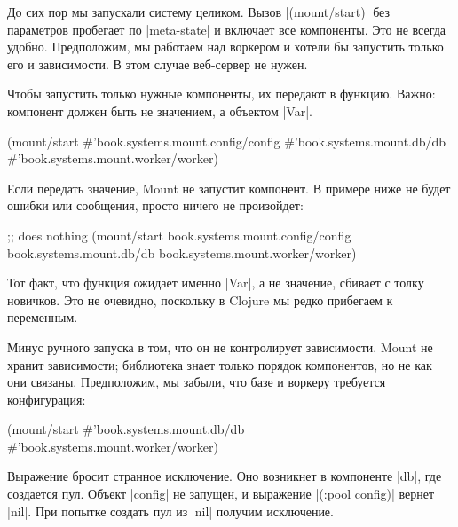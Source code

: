 До сих пор мы запускали систему целиком. Вызов \spverb|(mount/start)| без
параметров пробегает по \spverb|meta-state| и включает все компоненты. Это не
всегда удобно. Предположим, мы работаем над воркером и хотели бы запустить
только его и зависимости. В этом случае веб-сервер не нужен.

Чтобы запустить только нужные компоненты, их передают в функцию. Важно:
компонент должен быть не значением, а объектом \spverb|Var|.


\begin{english}
  \begin{clojure}
(mount/start #'book.systems.mount.config/config
             #'book.systems.mount.db/db
             #'book.systems.mount.worker/worker)
  \end{clojure}
\end{english}

Если передать значение, Mount не запустит компонент. В примере ниже не
будет ошибки или сообщения, просто ничего не произойдет:

\begin{english}
  \begin{clojure}
;; does nothing
(mount/start book.systems.mount.config/config
             book.systems.mount.db/db
             book.systems.mount.worker/worker)
  \end{clojure}
\end{english}

Тот факт, что функция ожидает именно \spverb|Var|, а не значение, сбивает с
толку новичков. Это не очевидно, поскольку в Clojure мы редко прибегаем к
переменным.

Минус ручного запуска в том, что он не контролирует зависимости. Mount
не хранит зависимости; библиотека знает только порядок компонентов, но не как
они связаны. Предположим, мы забыли, что базе и воркеру требуется конфигурация:

\begin{english}
  \begin{clojure}
(mount/start #'book.systems.mount.db/db
             #'book.systems.mount.worker/worker)
  \end{clojure}
\end{english}

Выражение бросит странное исключение. Оно возникнет в компоненте \spverb|db|,
где создается пул. Объект \spverb|config| не запущен, и выражение
\spverb|(:pool config)| вернет \spverb|nil|. При попытке создать пул из \spverb|nil| получим
исключение.

